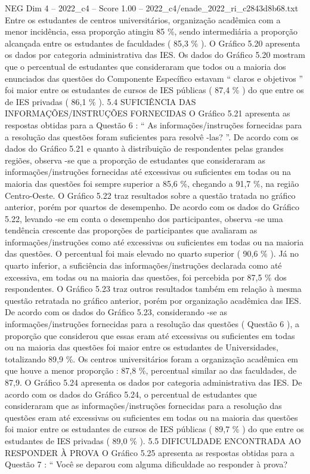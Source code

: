 \begin{textsample}{NEG Dim 4 – 2022\_c4 – Score 1.00 – 2022\_c4/enade\_2022\_ri\_c2843d8b68.txt}
Entre os estudantes de centros universitários, organização acadêmica com a menor incidência, essa proporção atingiu 85 \%, sendo intermediária a proporção alcançada entre os estudantes de faculdades ( 85,3 \% ).
O Gráfico 5.20 apresenta os dados por categoria administrativa das IES.
Os dados do Gráfico 5.20 mostram que o percentual de estudantes que consideraram que todos ou a maioria dos enunciados das questões do Componente Específico estavam “ claros e objetivos ” foi maior entre os estudantes de cursos de IES públicas ( 87,4 \% ) do que entre os de IES privadas ( 86,1 \% ). 5.4 SUFICIÊNCIA DAS INFORMAÇÕES/INSTRUÇÕES FORNECIDAS O Gráfico 5.21 apresenta as respostas obtidas para a Questão 6 : “ As informações/instruções fornecidas para a resolução das questões foram suficientes para resolvê -las? ”.
De acordo com os dados do Gráfico 5.21 e quanto à distribuição de respondentes pelas grandes regiões, observa -se que a proporção de estudantes que consideraram as informações/instruções fornecidas até excessivas ou suficientes em todas ou na maioria das questões foi sempre superior a 85,6 \%, chegando a 91,7 \%, na região Centro-Oeste.
O Gráfico 5.22 traz resultados sobre a questão tratada no gráfico anterior, porém por quartos de desempenho.
De acordo com os dados do Gráfico 5.22, levando -se em conta o desempenho dos participantes, observa -se uma tendência crescente das proporções de participantes que avaliaram as informações/instruções como até excessivas ou suficientes em todas ou na maioria das questões.
O percentual foi mais elevado no quarto superior ( 90,6 \% ).
Já no quarto inferior, a suficiência das informações/instruções declarada como até excessiva, em todas ou na maioria das questões, foi percebida por 87,5 \% dos respondentes.
O Gráfico 5.23 traz outros resultados também em relação à mesma questão retratada no gráfico anterior, porém por organização acadêmica das IES.
De acordo com os dados do Gráfico 5.23, considerando -se as informações/instruções fornecidas para a resolução das questões ( Questão 6 ), a proporção que considerou que essas eram até excessivas ou suficientes em todas ou na maioria das questões foi maior entre os estudantes de Universidades, totalizando 89,9 \%.
Os centros universitários foram a organização acadêmica em que houve a menor proporção : 87,8 \%, percentual similar ao das faculdades, de 87,9.
O Gráfico 5.24 apresenta os dados por categoria administrativa das IES.
De acordo com os dados do Gráfico 5.24, o percentual de estudantes que consideraram que as informações/instruções fornecidas para a resolução das questões eram até excessivas ou suficientes em todas ou na maioria das questões foi maior entre os estudantes de cursos de IES públicas ( 89,7 \% ) do que entre os estudantes de IES privadas ( 89,0 \% ). 5.5 DIFICULDADE ENCONTRADA AO RESPONDER À PROVA O Gráfico 5.25 apresenta as respostas obtidas para a Questão 7 : “ Você se deparou com alguma dificuldade ao responder à prova?

\end{textsample}
